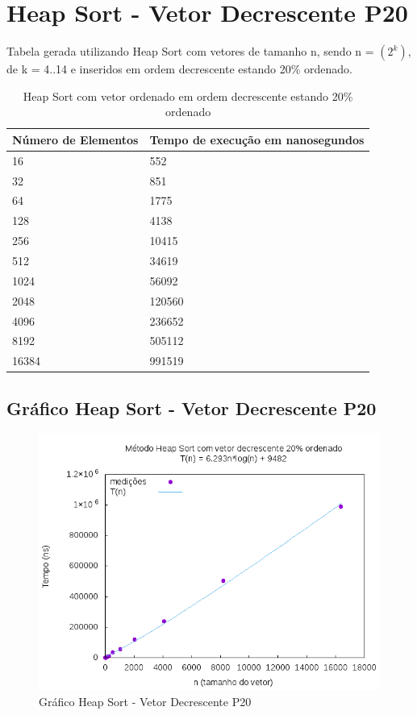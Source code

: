 \documentclass[12pt,a4paper,twoside]{report}
\begin{document}
\section{Heap Sort - Vetor Decrescente P20}
Tabela gerada utilizando Heap Sort com vetores de tamanho n, sendo n = $(2^k)$, de k = 4..14 e inseridos em ordem decrescente estando 20\% ordenado.
\begin{table}[H]
\centering
\caption{Heap Sort com vetor ordenado em ordem decrescente estando 20\% ordenado}
\label{my-label}
\begin{tabular}{|l|l|}
\hline
\multicolumn{1}{|c|}{\textbf{Número de Elementos}} & \multicolumn{1}{c|}{\textbf{Tempo de execução em nanosegundos}} \\ \hline
16 & 552 \\ \hline
32 & 851 \\ \hline
64 & 1775 \\ \hline
128 & 4138 \\ \hline
256 & 10415 \\ \hline
512 & 34619 \\ \hline
1024 & 56092 \\ \hline
2048 & 120560 \\ \hline
4096 & 236652 \\ \hline
8192 & 505112 \\ \hline
16384 & 991519 \\ \hline
\end{tabular}
\end{table}

\subsection{Gráfico Heap Sort - Vetor Decrescente P20}
\begin{figure}[H]
    \centering
    \includegraphics[width=0.7\linewidth]{graficos/HeapSort/vIntDecrescenteP20/vIntDecrescenteP20.png}
  \caption{Gráfico Heap Sort - Vetor Decrescente P20}
\end{figure}
\end{document}

